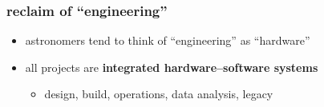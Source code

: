 \documentclass{beamer}
\renewcommand{\emph}[1]{\textbf{#1}}
\begin{document}
\begin{frame}
  \frametitle{reclaim of ``engineering''}
  \begin{itemize}
  \item astronomers tend to think of ``engineering'' as ``hardware''
  \item all projects are \emph{integrated hardware--software systems}
    \begin{itemize}
    \item design, build, operations, data analysis, legacy
    \end{itemize}
  \end{itemize}
\end{frame}
\end{document}
